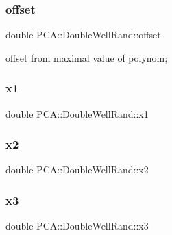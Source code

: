 \subsubsection{\texorpdfstring{offset}{offset}}
{\footnotesize\ttfamily double P\+C\+A\+::\+Double\+Well\+Rand\+::offset\hspace{0.3cm}{\ttfamily [private]}}



offset from maximal value of polynom; 

\hypertarget{class_p_c_a_1_1_double_well_rand_ab624775bcfb6b575ae1aa099bcd78cd7}{}\label{class_p_c_a_1_1_double_well_rand_ab624775bcfb6b575ae1aa099bcd78cd7} 
\subsubsection{\texorpdfstring{x1}{x1}}
{\footnotesize\ttfamily double P\+C\+A\+::\+Double\+Well\+Rand\+::x1\hspace{0.3cm}{\ttfamily [private]}}

\hypertarget{class_p_c_a_1_1_double_well_rand_a116879814f1ddd7bfc1efc3c11bf8c5b}{}\label{class_p_c_a_1_1_double_well_rand_a116879814f1ddd7bfc1efc3c11bf8c5b} 
\subsubsection{\texorpdfstring{x2}{x2}}
{\footnotesize\ttfamily double P\+C\+A\+::\+Double\+Well\+Rand\+::x2\hspace{0.3cm}{\ttfamily [private]}}

\hypertarget{class_p_c_a_1_1_double_well_rand_a2ac7d1cea509a918639ccb8bef3f1d0a}{}\label{class_p_c_a_1_1_double_well_rand_a2ac7d1cea509a918639ccb8bef3f1d0a} 
\subsubsection{\texorpdfstring{x3}{x3}}
{\footnotesize\ttfamily double P\+C\+A\+::\+Double\+Well\+Rand\+::x3\hspace{0.3cm}{\ttfamily [private]}}

